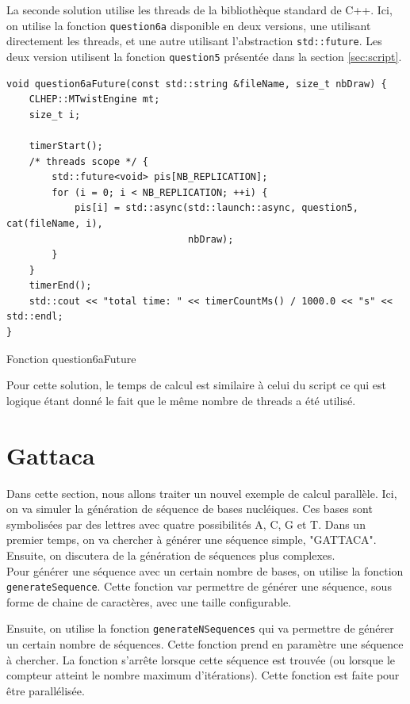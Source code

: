 \documentclass[a4paper]{article}
\begin{document}
La seconde solution utilise les threads de la bibliothèque standard de C++. Ici,
on utilise la fonction \texttt{question6a} disponible en deux versions, une
utilisant directement les threads, et une autre utilisant l'abstraction
\texttt{std::future}. Les deux version utilisent la fonction
\texttt{question5} présentée dans la section \ref{sec:script}.

\begin{listing}[ht!]
\begin{verbatim}
void question6aFuture(const std::string &fileName, size_t nbDraw) {
    CLHEP::MTwistEngine mt;
    size_t i;

    timerStart();
    /* threads scope */ {
        std::future<void> pis[NB_REPLICATION];
        for (i = 0; i < NB_REPLICATION; ++i) {
            pis[i] = std::async(std::launch::async, question5, cat(fileName, i),
                                nbDraw);
        }
    }
    timerEnd();
    std::cout << "total time: " << timerCountMs() / 1000.0 << "s" << std::endl;
}
\end{verbatim}
\caption{Fonction question6aFuture}
\label{fn-q6}
\end{listing}

Pour cette solution, le temps de calcul est similaire à celui du script ce qui
est logique étant donné le fait que le même nombre de threads a été utilisé.

\clearpage
\section{Gattaca}

Dans cette section, nous allons traiter un nouvel exemple de calcul parallèle.
Ici, on va simuler la génération de séquence de bases nucléiques. Ces bases sont
symbolisées par des lettres avec quatre possibilités A, C, G et T. Dans un
premier temps, on va chercher à générer une séquence simple, "GATTACA". Ensuite,
on discutera de la génération de séquences plus complexes.\\

Pour générer une séquence avec un certain nombre de bases, on utilise la
fonction \texttt{generateSequence}. Cette fonction var permettre de générer
une séquence, sous forme de chaine de caractères, avec une taille configurable.

Ensuite, on utilise la fonction \texttt{generateNSequences} qui va permettre
de générer un certain nombre de séquences. Cette fonction prend en paramètre une
séquence à chercher. La fonction s'arrête lorsque cette séquence est trouvée (ou
lorsque le compteur atteint le nombre maximum d'itérations). Cette fonction est
faite pour être parallélisée.
\end{document}
